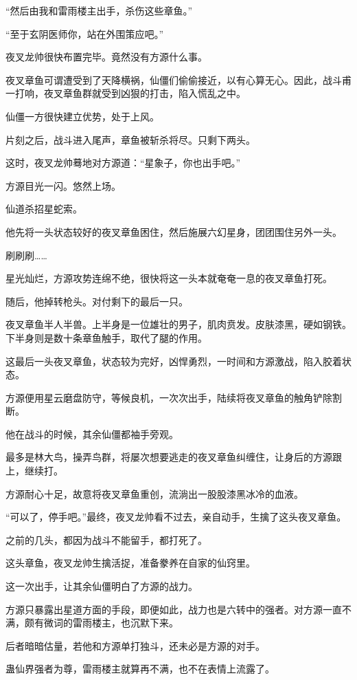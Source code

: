 \begin{this_body}
“然后由我和雷雨楼主出手，杀伤这些章鱼。”

“至于玄阴医师你，站在外围策应吧。”

夜叉龙帅很快布置完毕。竟然没有方源什么事。

夜叉章鱼可谓遭受到了天降横祸，仙僵们偷偷接近，以有心算无心。因此，战斗甫一打响，夜叉章鱼群就受到凶狠的打击，陷入慌乱之中。

仙僵一方很快建立优势，处于上风。

片刻之后，战斗进入尾声，章鱼被斩杀将尽。只剩下两头。

这时，夜叉龙帅蓦地对方源道：“星象子，你也出手吧。”

方源目光一闪。悠然上场。

仙道杀招星蛇索。

他先将一头状态较好的夜叉章鱼困住，然后施展六幻星身，团团围住另外一头。

刷刷刷……

星光灿烂，方源攻势连绵不绝，很快将这一头本就奄奄一息的夜叉章鱼打死。

随后，他掉转枪头。对付剩下的最后一只。

夜叉章鱼半人半兽。上半身是一位雄壮的男子，肌肉贲发。皮肤漆黑，硬如钢铁。下半身则是数十条章鱼触手，取代了腿的作用。

这最后一头夜叉章鱼，状态较为完好，凶悍勇烈，一时间和方源激战，陷入胶着状态。

方源便用星云磨盘防守，等候良机，一次次出手，陆续将夜叉章鱼的触角铲除割断。

他在战斗的时候，其余仙僵都袖手旁观。

最多是林大鸟，操弄鸟群，将屡次想要逃走的夜叉章鱼纠缠住，让身后的方源跟上，继续打。

方源耐心十足，故意将夜叉章鱼重创，流淌出一股股漆黑冰冷的血液。

“可以了，停手吧。”最终，夜叉龙帅看不过去，亲自动手，生擒了这头夜叉章鱼。

之前的几头，都因为战斗不能留手，都打死了。

这头章鱼，夜叉龙帅生擒活捉，准备豢养在自家的仙窍里。

这一次出手，让其余仙僵明白了方源的战力。

方源只暴露出星道方面的手段，即便如此，战力也是六转中的强者。对方源一直不满，颇有微词的雷雨楼主，也沉默下来。

后者暗暗估量，若他和方源单打独斗，还未必是方源的对手。

蛊仙界强者为尊，雷雨楼主就算再不满，也不在表情上流露了。


\end{this_body}
